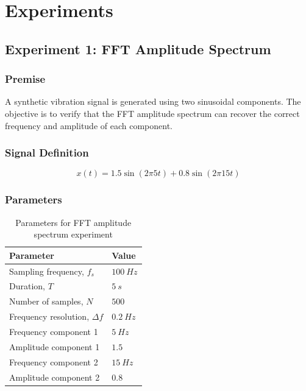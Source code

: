 \documentclass[11pt,a4paper]{article}
\begin{document}
\section{Experiments}

\subsection{Experiment 1: FFT Amplitude Spectrum}

\subsubsection{Premise}

A synthetic vibration signal is generated using two sinusoidal components. The objective is to verify that the FFT amplitude spectrum can recover the correct frequency and amplitude of each component.

\subsubsection{Signal Definition}

\begin{equation}
    x(t) =
    1.5 \sin(2\pi 5t)
    +
    0.8 \sin(2\pi 15t)
\end{equation}

\subsubsection{Parameters}

\begin{table}[H]
\centering
\caption{Parameters for FFT amplitude spectrum experiment}
\begin{tabular}{ll}
\toprule
Parameter & Value \\
\midrule
Sampling frequency, \(f_s\) & \(100\ \si{Hz}\) \\
Duration, \(T\) & \(5\ \si{s}\) \\
Number of samples, \(N\) & \(500\) \\
Frequency resolution, \(\Delta f\) & \(0.2\ \si{Hz}\) \\
Frequency component 1 & \(5\ \si{Hz}\) \\
Amplitude component 1 & \(1.5\) \\
Frequency component 2 & \(15\ \si{Hz}\) \\
Amplitude component 2 & \(0.8\) \\
\bottomrule
\end{tabular}
\end{table}
\end{document}
